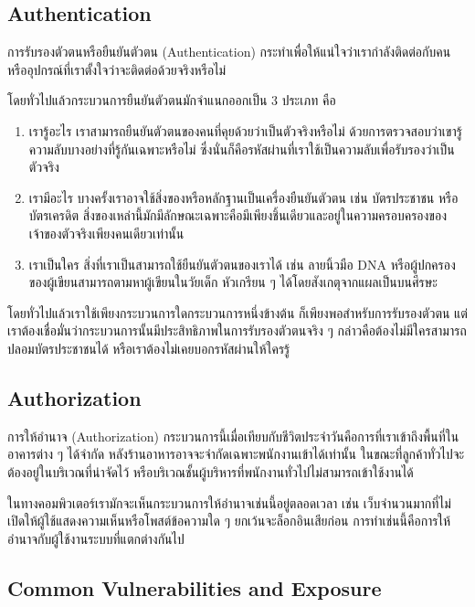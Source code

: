 \subsection{Authentication}

การรับรองตัวตนหรือยืนยันตัวตน (Authentication) กระทำเพื่อให้แน่ใจว่าเรากำลังติดต่อกับคนหรืออุปกรณ์ที่เราตั้งใจว่าจะติดต่อด้วยจริงหรือไม่

โดยทั่วไปแล้วกระบวนการยืนยันตัวตนมักจำแนกออกเป็น 3 ประเภท คือ

\begin{enumerate}
	\item เรารู้อะไร เราสามารถยืนยันตัวตนของคนที่คุยด้วยว่าเป็นตัวจริงหรือไม่ ด้วยการตรวจสอบว่าเขารู้ความลับบางอย่างที่รู้กันเฉพาะหรือไม่ ซึ่งนั่นก็คือรหัสผ่านที่เราใช้เป็นความลับเพื่อรับรองว่าเป็นตัวจริง 
	\item เรามีอะไร บางครั้งเราอาจใช้สิ่งของหรือหลักฐานเป็นเครื่องยืนยันตัวตน เช่น บัตรประชาชน หรือบัตรเครดิต สิ่งของเหล่านี้มักมีลักษณะเฉพาะคือมีเพียงชิ้นเดียวและอยู่ในความครอบครองของเจ้าของตัวจริงเพียงคนเดียวเท่านั้น
	\item เราเป็นใคร สิ่งที่เราเป็นสามารถใช้ยืนยันตัวตนของเราได้ เช่น ลายนิ้วมือ DNA หรือผู้ปกครองของผู้เขียนสามารถตามหาผู้เขียนในวัยเด็ก หัวเกรียน ๆ ได้โดยสังเกตุจากแผลเป็นบนศีรษะ
\end{enumerate}

โดยทั่วไปแล้วเราใช้เพียงกระบวนการใดกระบวนการหนึ่งข้างต้น ก็เพียงพอสำหรับการรับรองตัวตน แต่เราต้องเชื่อมั่นว่ากระบวนการนั้นมีประสิทธิภาพในการรับรองตัวตนจริง ๆ กล่าวคือต้องไม่มีใครสามารถปลอมบัตรประชาชนได้ หรือเราต้องไม่เคยบอกรหัสผ่านให้ใครรู้

\subsection{Authorization}

การให้อำนาจ (Authorization) กระบวนการนี้เมื่อเทียบกับชีวิตประจำวันคือการที่เราเข้าถึงพื้นที่ในอาคารต่าง ๆ ได้จำกัด หลังร้านอาหารอาจจะจำกัดเฉพาะพนักงานเข้าได้เท่านั้น ในขณะที่ลูกค้าทั่วไปจะต้องอยู่ในบริเวณที่น่าจัดไว้ หรือบริเวณชั้นผู้บริหารที่พนักงานทั่วไปไม่สามารถเข้าใช้งานได้ 

ในทางคอมพิวเตอร์เรามักจะเห็นกระบวนการให้อำนาจเช่นนี้อยู่ตลอดเวลา เช่น เว็บจำนวนมากที่ไม่เปิดให้ผู้ใช้แสดงความเห็นหรือโพสต์ข้อความใด ๆ ยกเว้นจะล็อกอินเสียก่อน การทำเช่นนี้คือการให้อำนาจกับผู้ใช้งานระบบที่แตกต่างกันไป

\subsection{Common Vulnerabilities and Exposure}

